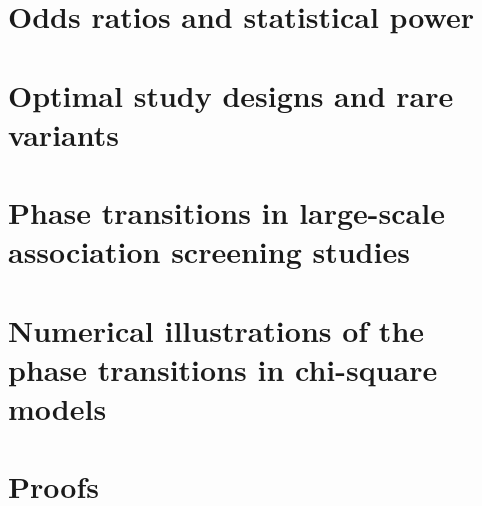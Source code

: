 \section{Odds ratios and statistical power}
\label{sec:odds-and-power}



\section{Optimal study designs and rare variants}
\label{sec:optimal-design} 



\section{Phase transitions in large-scale association screening studies}
\label{sec:phase-transitions-in-GWAS}



\section{Numerical illustrations of the phase transitions in chi-square models}
\label{sec:numerical}



\section{Proofs}
\label{sec:proof-signal-size-odds-ratio}

